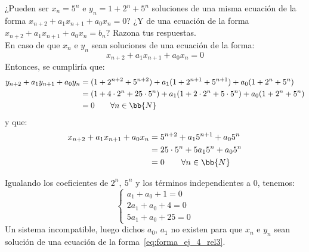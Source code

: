 \begin{ejercicio}
    ¿Pueden ser $x_n = 5^n$ e $y_n = 1 + 2^n + 5^n$ soluciones de una misma ecuación de la forma $x_{n+2} + a_1 x_{n+1} + a_0 x_n = 0$?
    ¿Y de una ecuación de la forma $x_{n+2} + a_1 x_{n+1} + a_0 x_n = b_n$? Razona tus respuestas.\\

    En caso de que $x_n$ e $y_n$ sean soluciones de una ecuación de la forma:
    \begin{equation}\label{eq:forma_ej_4_rel3}
        x_{n+2} + a_1 x_{n+1} + a_0 x_n = 0
    \end{equation}
    Entonces, se cumpliría que:
    \begin{align*}
        y_{n+2} + a_1 y_{n+1} + a_0 y_n &= (1+2^{n+2}+5^{n+2}) + a_1(1+2^{n+1}+5^{n+1}) + a_0 (1+2^{n}+5^{n}) \\
        &= (1+4\cdot 2^n + 25\cdot 5^n) + a_1(1+2\cdot 2^n + 5\cdot 5^n) + a_0 (1 + 2^n + 5^n) \\
        &= 0\qquad \forall n \in \bb{N}
    \end{align*}
    y que:
    \begin{align*}
        x_{n+2} + a_1 x_{n+1} + a_0 x_n &= 5^{n+2} + a_15^{n+1} + a_05^n \\
        &= 25\cdot 5^n + 5a_15^n + a_0 5^n \\
        &= 0 \qquad \forall n \in \bb{N}
    \end{align*}
    
    Igualando los coeficientes de $2^n,~5^n$ y los términos independientes a $0$, tenemos:
    \begin{equation*}
        \left\{\begin{array}{l}
            a_1 + a_0 + 1 = 0 \\
            2a_1 + a_0 + 4 = 0 \\
            5a_1 + a_0 + 25 = 0 
        \end{array}\right.
    \end{equation*}
    Un sistema incompatible, luego dichos $a_0$, $a_1$ no existen para que $x_n$ e $y_n$ sean solución de una ecuación de la forma~\ref{eq:forma_ej_4_rel3}.\\


\end{ejercicio}
